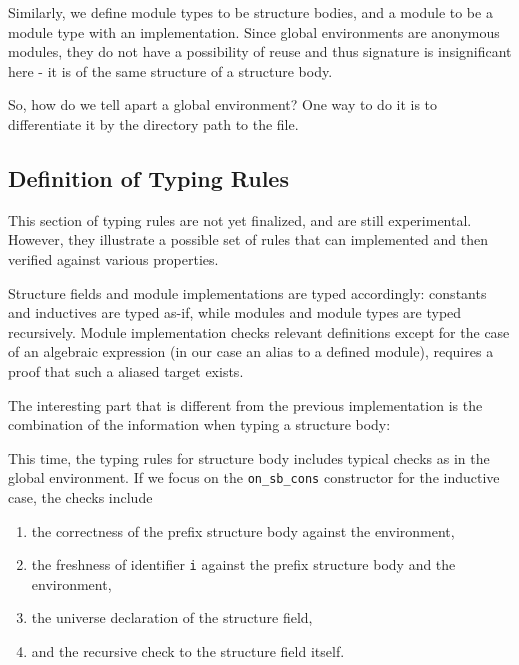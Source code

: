 
Similarly, we define module types to be structure bodies, and a module to be a
module type with an implementation. Since global environments are anonymous
modules, they do not have a possibility of reuse and thus signature is
insignificant here - it is of the same structure of a structure body.

So, how do we tell apart a global environment? One way to do it is to
differentiate it by the directory path to the file.


\subsection{Definition of Typing Rules}
This section of typing rules are not yet finalized, and are still experimental.
However, they illustrate a possible set of rules that can implemented and then
verified against various properties.


Structure fields and module implementations are typed accordingly: constants and
inductives are typed as-if, while modules and module types are typed
recursively. Module implementation checks relevant definitions except for the
case of an algebraic expression (in our case an alias to a defined module),
requires a proof that such a aliased target exists.

The interesting part that is different from the previous implementation is the
combination of the information when typing a structure body:


This time, the typing rules for structure body includes typical checks as in the
global environment. If we focus on the \verb|on_sb_cons| constructor for the
inductive case, the checks include
\begin{enumerate}
  \item the correctness of the prefix structure body against the environment,
  \item the freshness of identifier \verb|i| against the prefix structure body
  and the environment,
  \item the universe declaration of the structure field,
  \item and the recursive check to the structure field itself.
\end{enumerate} 

